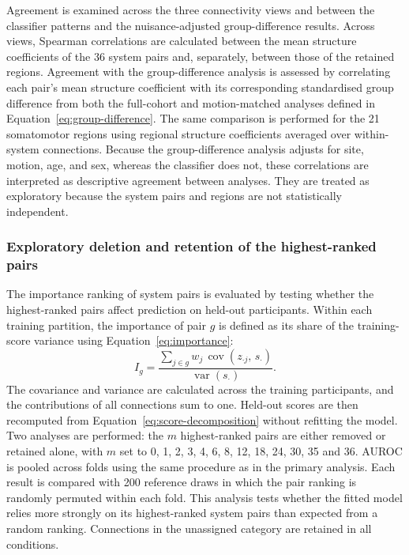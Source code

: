 Agreement is examined across the three connectivity views and between the classifier patterns and the nuisance-adjusted group-difference results. Across views, Spearman correlations are calculated between the mean structure coefficients of the 36 system pairs and, separately, between those of the retained regions. Agreement with the group-difference analysis is assessed by correlating each pair's mean structure coefficient with its corresponding standardised group difference from both the full-cohort and motion-matched analyses defined in Equation~\eqref{eq:group-difference}. The same comparison is performed for the 21 somatomotor regions using regional structure coefficients averaged over within-system connections. Because the group-difference analysis adjusts for site, motion, age, and sex, whereas the classifier does not, these correlations are interpreted as descriptive agreement between analyses. They are treated as exploratory because the system pairs and regions are not statistically independent.

\subsubsection{Exploratory deletion and retention of the highest-ranked pairs}
\label{subsubsec:deletion-retention}

The importance ranking of system pairs is evaluated by testing whether the highest-ranked pairs affect prediction on held-out participants. Within each training partition, the importance of pair $g$ is defined as its share of the training-score variance using Equation~\eqref{eq:importance}:
\begin{equation}
I_g
=
\frac{\sum_{j\in g} w_j\,\operatorname{cov}\!\left(z_{\cdot j},\, s_{\cdot}\right)}{\operatorname{var}\!\left(s_{\cdot}\right)}.
\label{eq:importance}
\end{equation}
The covariance and variance are calculated across the training participants, and the contributions of all connections sum to one. Held-out scores are then recomputed from Equation~\eqref{eq:score-decomposition} without refitting the model. Two analyses are performed: the $m$ highest-ranked pairs are either removed or retained alone, with $m$ set to 0, 1, 2, 3, 4, 6, 8, 12, 18, 24, 30, 35 and 36. AUROC is pooled across folds using the same procedure as in the primary analysis. Each result is compared with 200 reference draws in which the pair ranking is randomly permuted within each fold. This analysis tests whether the fitted model relies more strongly on its highest-ranked system pairs than expected from a random ranking. Connections in the unassigned category are retained in all conditions.

